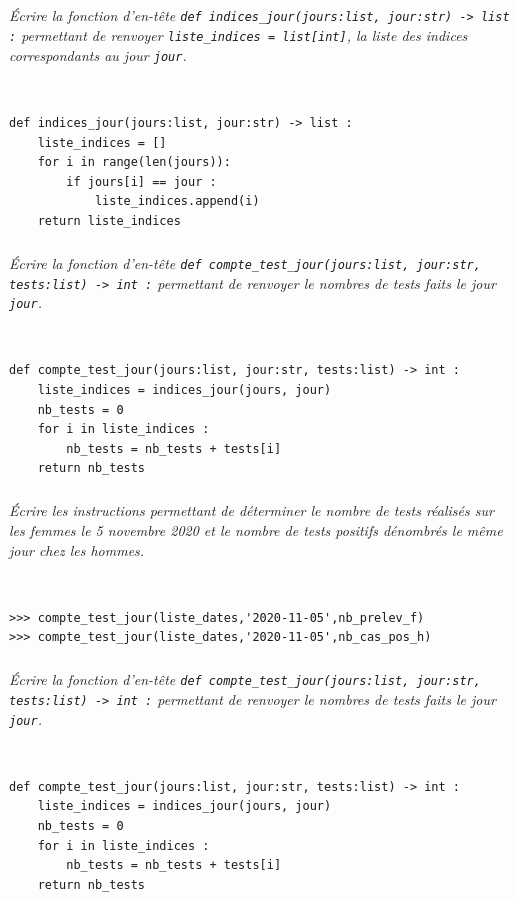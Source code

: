 \documentclass[10pt,fleqn]{article} %
\begin{document}
\subparagraph{}
\textit{Écrire la fonction d’en-tête \texttt{def indices\_jour(jours:list, jour:str) -> list :} permettant de renvoyer  \texttt{liste\_indices = list[int]}, la liste des indices correspondants au jour \texttt{jour}.}
\ifprof
\begin{corrige}~\\
\begin{lstlisting}
def indices_jour(jours:list, jour:str) -> list :
    liste_indices = []
    for i in range(len(jours)):
        if jours[i] == jour :
            liste_indices.append(i)
    return liste_indices
\end{lstlisting}
\end{corrige}
\else
\fi

\subparagraph{}
\textit{Écrire la fonction d’en-tête \texttt{def compte\_test\_jour(jours:list, jour:str, tests:list) -> int :} permettant de renvoyer le nombres de tests faits le jour \texttt{jour}.}
\ifprof
\begin{corrige}~\\
\begin{lstlisting}
def compte_test_jour(jours:list, jour:str, tests:list) -> int :
    liste_indices = indices_jour(jours, jour)
    nb_tests = 0
    for i in liste_indices : 
        nb_tests = nb_tests + tests[i]
    return nb_tests
\end{lstlisting}
\end{corrige}
\else
\fi


\subparagraph{}
\textit{Écrire les instructions permettant de déterminer le nombre de tests réalisés sur les femmes le 5 novembre 2020 et le nombre de tests positifs dénombrés le même jour chez les hommes.}
\ifprof
\begin{corrige}~\\
\begin{lstlisting}
>>> compte_test_jour(liste_dates,'2020-11-05',nb_prelev_f)
>>> compte_test_jour(liste_dates,'2020-11-05',nb_cas_pos_h)
\end{lstlisting}
\end{corrige}
\else
\fi


\subparagraph{}
\textit{Écrire la fonction d’en-tête \texttt{def compte\_test\_jour(jours:list, jour:str, tests:list) -> int :} permettant de renvoyer le nombres de tests faits le jour \texttt{jour}.}%
\ifprof
\begin{corrige}~\\
\begin{lstlisting}
def compte_test_jour(jours:list, jour:str, tests:list) -> int :
    liste_indices = indices_jour(jours, jour)
    nb_tests = 0
    for i in liste_indices : 
        nb_tests = nb_tests + tests[i]
    return nb_tests
\end{lstlisting}
\end{corrige}
\else
\fi
\end{document}
